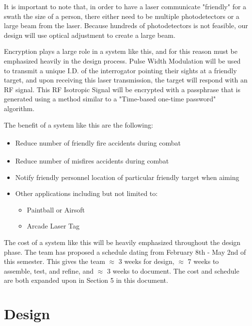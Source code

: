\documentclass[openbib,letterpaper,10pt]{article}
\begin{document}
\begin{spacing}{1.15}
It is important to note that, in order to have a laser communicate "friendly" for a swath the size of a person, there either need to be multiple photodetectors or a large beam from the laser. Because hundreds of photodetectors is not feasible, our design will use optical adjustment to create a large beam. 

Encryption plays a large role in a system like this, and for this reason must be emphasized heavily in the design process. Pulse Width Modulation will be used to transmit a unique I.D. of the interrogator pointing their sights at a friendly target, and upon receiving this laser transmission, the target will respond with an RF signal. This RF Isotropic Signal will be encrypted with a passphrase that is generated using a method similar to a "Time-based one-time password" algorithm.

The benefit of a system like this are the following:
\begin{itemize}
	\item Reduce number of friendly fire accidents during combat \textsuperscript{\cite{Garrison}}
	\item Reduce number of misfires accidents during combat \textsuperscript{\cite{Garrison}}
	\item Notify friendly personnel location of particular friendly target when aiming
	\item Other applications including but not limited to:
	\begin{itemize}
		\item Paintball or Airsoft
		\item Arcade Laser Tag
	\end{itemize}
\end{itemize}

The cost of a system like this will be heavily emphasized throughout the design phase. The team has proposed a schedule dating from February 8th - May 2nd of this semester. This gives the team $\approx$ 3 weeks for design, $\approx$ 7 weeks to assemble, test, and refine, and $\approx$ 3 weeks to document. The cost and schedule are both expanded upon in Section 5 in this document.\\

\clearpage

\section{Design}

\end{spacing}
\end{document}
